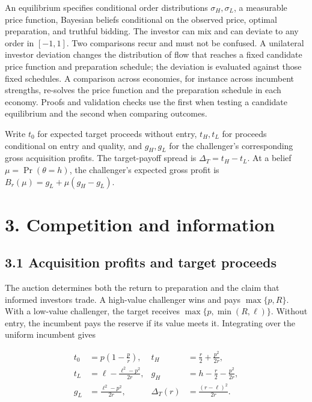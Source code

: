 \documentclass[
  12pt,
]{article}
\begin{document}
An equilibrium specifies conditional order distributions
\(\sigma_H,\sigma_L\), a measurable price function, Bayesian beliefs
conditional on the observed price, optimal preparation, and truthful
bidding. The investor can mix and can deviate to any order in
\([-1,1]\). Two comparisons recur and must not be confused. A unilateral
investor deviation changes the distribution of flow that reaches a fixed
candidate price function and preparation schedule; the deviation is
evaluated against those fixed schedules. A comparison across economies,
for instance across incumbent strengths, re-solves the price function
and the preparation schedule in each economy. Proofs and validation
checks use the first when testing a candidate equilibrium and the second
when comparing outcomes.

Write \(t_0\) for expected target proceeds without entry, \(t_H,t_L\)
for proceeds conditional on entry and quality, and \(g_H,g_L\) for the
challenger's corresponding gross acquisition profits. The target-payoff
spread is \(\Delta_T=t_H-t_L\). At a belief \(\mu=\Pr(\theta=h)\), the
challenger's expected gross profit is \(B_r(\mu)=g_L+\mu(g_H-g_L)\).

\section{3. Competition and information}\label{sec-payoffs}

\subsection{3.1 Acquisition profits and target
proceeds}\label{sec-acquisition-profits-and-target-proceeds}

The auction determines both the return to preparation and the claim that
informed investors trade. A high-value challenger wins and pays
\(\max\{p,R\}\). With a low-value challenger, the target receives
\(\max\{p,\min(R,\ell)\}\). Without entry, the incumbent pays the
reserve if its value meets it. Integrating over the uniform incumbent
gives

\[
\begin{aligned}
t_0&=p\left(1-\frac p r\right),&
t_H&=\frac r2+\frac{p^2}{2r},\\
t_L&=\ell-\frac{\ell^2-p^2}{2r},&
g_H&=h-\frac r2-\frac{p^2}{2r},\\
g_L&=\frac{\ell^2-p^2}{2r},&
\Delta_T(r)&=\frac{(r-\ell)^2}{2r}.
\end{aligned}
\tag{4}\label{eq:paper-4}
\]
\end{document}
